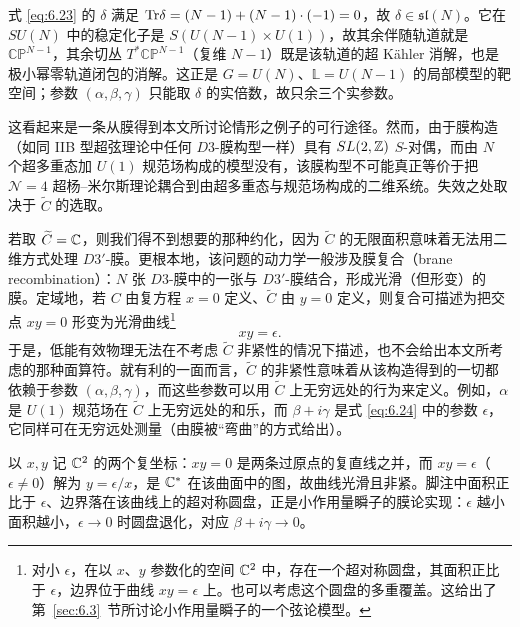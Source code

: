 \begin{yizhu}[物理图像补充]式 \eqref{eq:6.23} 的 $\delta$ 满足 ${\rm Tr}\delta=(N-1)+(N-1)\cdot(-1)=0$，故 $\delta\in\mathfrak{sl}(N)$。它在 $SU(N)$ 中的稳定化子是 $S(U(N-1)\times U(1))$，故其余伴随轨道就是 $\mathbb{CP}^{N-1}$，其余切丛 $T^*\mathbb{CP}^{N-1}$（复维 $N-1$）既是该轨道的超 Kähler 消解，也是极小幂零轨道闭包的消解。这正是 $G=U(N)$、$\mathbb L=U(N-1)$ 的局部模型的靶空间；参数 $(\alpha,\beta,\gamma)$ 只能取 $\delta$ 的实倍数，故只余三个实参数。\end{yizhu}


这看起来是一条从膜得到本文所讨论情形之例子的可行途径。然而，由于膜构造（如同 IIB 型超弦理论中任何 $D3$-膜构型一样）具有 $SL(2,{\mathbb{Z}})$ $S$-对偶，而由 $N$ 个超多重态加 $U(1)$ 规范场构成的模型没有，该膜构型不可能真正等价于把 ${\mathcal N}=4$ 超杨–米尔斯理论耦合到由超多重态与规范场构成的二维系统。失效之处取决于 $\tilde C$ 的选取。

若取 $\widetilde C={\mathbb{C}}$，则我们得不到想要的那种约化，因为 $\tilde C$ 的无限面积意味着无法用二维方式处理 $D3'$-膜。更根本地，该问题的动力学一般涉及膜复合（brane recombination）：$N$ 张 $D3$-膜中的一张与 $D3'$-膜结合，形成光滑（但形变）的膜。定域地，若 $C$ 由复方程 $x=0$ 定义、$\tilde C$ 由 $y=0$ 定义，则复合可描述为把交点 $xy=0$ 形变为光滑曲线\footnote{对小 $\epsilon$，在以 $x$、$y$ 参数化的空间 ${\mathbb{C}}^2$ 中，存在一个超对称圆盘，其面积正比于 $\epsilon$，边界位于曲线 $xy=\epsilon$ 上。也可以考虑这个圆盘的多重覆盖。这给出了第~\ref{sec:6.3}~节所讨论小作用量瞬子的一个弦论模型。}
\setcounter{equation}{23}
\begin{equation}\label{eq:6.24}
  xy=\epsilon.
\end{equation}
于是，低能有效物理无法在不考虑 $\tilde C$ 非紧性的情况下描述，也不会给出本文所考虑的那种面算符。就有利的一面而言，$\tilde C$ 的非紧性意味着从该构造得到的一切都依赖于参数 $(\alpha,\beta,\gamma)$，而这些参数可以用 $\tilde C$ 上无穷远处的行为来定义。例如，$\alpha$ 是 $U(1)$ 规范场在 $\tilde C$ 上无穷远处的和乐，而 $\beta+i\gamma$ 是式 \eqref{eq:6.24} 中的参数 $\epsilon$，它同样可在无穷远处测量（由膜被“弯曲”的方式给出）。

\begin{yizhu}[物理图像补充]以 $x,y$ 记 ${\mathbb{C}}^2$ 的两个复坐标：$xy=0$ 是两条过原点的复直线之并，而 $xy=\epsilon$（$\epsilon\not=0$）解为 $y=\epsilon/x$，是 ${\mathbb{C}}^*$ 在该曲面中的图，故曲线光滑且非紧。脚注中面积正比于 $\epsilon$、边界落在该曲线上的超对称圆盘，正是小作用量瞬子的膜论实现：$\epsilon$ 越小面积越小，$\epsilon\to0$ 时圆盘退化，对应 $\beta+i\gamma\to0$。\end{yizhu}


